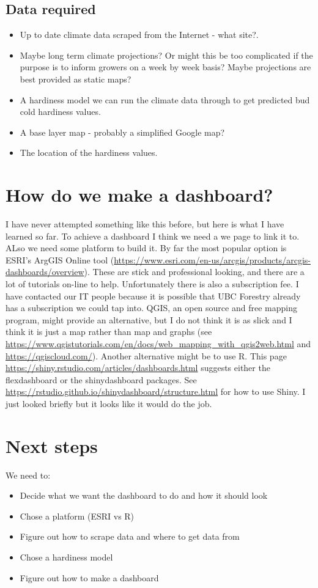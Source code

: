 \documentclass[11pt,letter]{article}
\begin{document}
\subsection{Data required}
\begin{itemize}
	\item Up to date climate data scraped from the Internet - what site?. 
	\item Maybe long term climate projections? Or might this be too complicated if the purpose is to inform growers on a week by week basis? Maybe projections are best provided as static maps?
	\item A hardiness model we can run the climate data through to get predicted bud cold hardiness values.  
	\item A base layer map - probably a simplified Google map?
	\item The location of the hardiness values. 
\end{itemize}

\section{How do we make a dashboard?}
I have never attempted something like this before, but here is what I have learned so far. To achieve a dashboard I think we need a we page to link it to. ALso we need some platform to build it. By far the most popular option is ESRI's ArgGIS Online tool (\url{https://www.esri.com/en-us/arcgis/products/arcgis-dashboards/overview}). These are stick and professional looking, and there are a lot of tutorials on-line to help. Unfortunately there is also a subscription fee. I have contacted our IT people because it is possible that UBC Forestry already has a subscription we could tap into. QGIS, an open source and free mapping program, might provide an alternative, but I do not think it is as slick and I think it is just a map rather than map and graphs (see \url{https://www.qgistutorials.com/en/docs/web_mapping_with_qgis2web.html}  and \url{https://qgiscloud.com/}). Another alternative might be to use R. This page \url{https://shiny.rstudio.com/articles/dashboards.html} suggests either the flexdashboard or the shinydashboard packages. See \url{https://rstudio.github.io/shinydashboard/structure.html} for how to use Shiny. I just looked briefly but it looks like it would do the job.       

\section{Next steps}

We need to:
\begin{itemize}
	\item Decide what we want the dashboard to do and how it should look
	\item Chose a platform (ESRI vs R)
	\item Figure out how to scrape data and where to get data from
	\item Chose a hardiness model 
	\item Figure out how to make a dashboard
\end{itemize}
\end{document}

